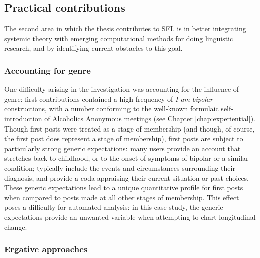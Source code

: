 
\subsection{Practical contributions}

The second area in which the thesis contributes to \gls{SFL} is in better integrating systemic theory with emerging computational methods for doing linguistic research, and by identifying current obstacles to this goal.

\subsubsection{Accounting for genre}

\noindent One difficulty arising in the investigation was accounting for the influence of genre: first contributions contained a high frequency of \emph{I am bipolar} constructions, with a number conforming to the well\hyp{}known formulaic self\hyp{}introduction of Alcoholics Anonymous meetings (see Chapter \ref{chap:experiential}). Though first \glspl{post} were treated as a stage of membership (and though, of course, the first \gls{post} does represent a stage of membership), first \glspl{post} are subject to particularly strong generic expectations: many users provide an account that stretches back to childhood, or to the onset of symptoms of bipolar or a similar condition;  typically include the events and circumstances surrounding their diagnosis, and provide a coda appraising their current situation or past choices. These generic expectations lead to a unique quantitative profile for first \glspl{post} when compared to \glspl{post} made at all other stages of membership. This effect poses a difficulty for automated analysis: in this case study, the generic expectations provide an unwanted variable when attempting to chart longitudinal change.


\subsubsection{Ergative approaches}

